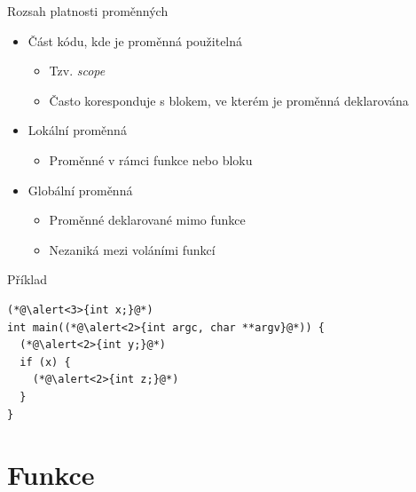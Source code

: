 \begin{frame}[fragile]{Rozsah platnosti proměnných}

  \begin{itemize}
    \item Část kódu, kde je proměnná použitelná
    \begin{itemize}
      \item Tzv. \textit{scope}
      \item Často koresponduje s blokem, ve kterém je proměnná deklarována
    \end{itemize}

    \pause

    \item Lokální proměnná
    \begin{itemize}
      \item Proměnné v rámci funkce nebo bloku
    \end{itemize}

    \pause

    \item Globální proměnná
    \begin{itemize}
      \item Proměnné deklarované mimo funkce
      \item Nezaniká mezi voláními funkcí
    \end{itemize}

  \end{itemize}


\begin{block}{Příklad}
\begin{lstlisting}
(*@\alert<3>{int x;}@*)
int main((*@\alert<2>{int argc, char **argv}@*)) {
  (*@\alert<2>{int y;}@*)
  if (x) {
    (*@\alert<2>{int z;}@*)
  }
}
\end{lstlisting}
\end{block}

\end{frame}


\section{Funkce}
\frame{\sectionpage}

